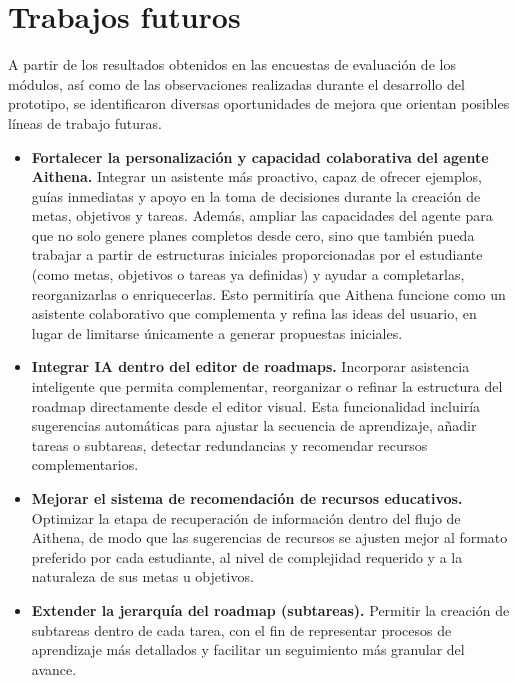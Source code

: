  \section{Trabajos futuros}

A partir de los resultados obtenidos en las encuestas de evaluación de los módulos, así como de las observaciones realizadas durante el desarrollo del prototipo, se identificaron diversas oportunidades de mejora que orientan posibles líneas de trabajo futuras.

\begin{itemize}

    \item \textbf{Fortalecer la personalización y capacidad colaborativa del agente Aithena.}  
    Integrar un asistente más proactivo, capaz de ofrecer ejemplos, guías inmediatas y apoyo en la toma de decisiones durante la creación de metas, objetivos y tareas. Además, ampliar las capacidades del agente para que no solo genere planes completos desde cero, sino que también pueda trabajar a partir de estructuras iniciales proporcionadas por el estudiante (como metas, objetivos o tareas ya definidas) y ayudar a completarlas, reorganizarlas o enriquecerlas. Esto permitiría que Aithena funcione como un asistente colaborativo que complementa y refina las ideas del usuario, en lugar de limitarse únicamente a generar propuestas iniciales.


    \item \textbf{Integrar IA dentro del editor de roadmaps.}  
    Incorporar asistencia inteligente que permita complementar, reorganizar o refinar la estructura del roadmap directamente desde el editor visual. Esta funcionalidad incluiría sugerencias automáticas para ajustar la secuencia de aprendizaje, añadir tareas o subtareas, detectar redundancias y recomendar recursos complementarios.

    \item \textbf{Mejorar el sistema de recomendación de recursos educativos.}  
    Optimizar la etapa de recuperación de información dentro del flujo de Aithena, de modo que las sugerencias de recursos se ajusten mejor al formato preferido por cada estudiante, al nivel de complejidad requerido y a la naturaleza de sus metas u objetivos.


    \item \textbf{Extender la jerarquía del roadmap (subtareas).}  
    Permitir la creación de subtareas dentro de cada tarea, con el fin de representar procesos de aprendizaje más detallados y facilitar un seguimiento más granular del avance.


\end{itemize}
